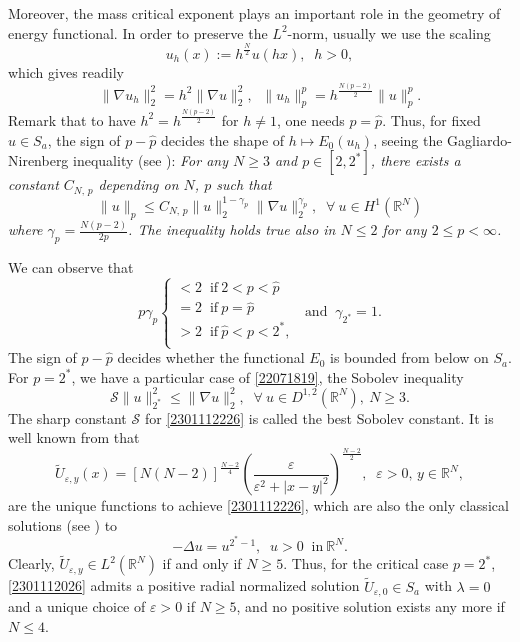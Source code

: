 \documentclass[10pt]{article}
\numberwithin{equation}{section}
\numberwithin{equation}{section}
\begin{document}
Moreover, the mass critical exponent plays an important role in the geometry of energy functional. In order to preserve the $L^2$-norm, usually we use the scaling
\begin{equation}\label{2301111617}
 u_h(x):=h^{\frac{N}{2}}u(h x),\;\; h>0,
\end{equation}
which gives readily
\[
\|\nabla u_h\|_2^2=h^2\|\nabla u\|_2^2, \;\;\| u_h\|_p^p=h^{\frac{N(p-2)}{2}}\|u\|_p^p.
\]
Remark that to have $h^2=h^{\frac{N(p-2)}{2}}$ for $h\neq 1$, one needs $p=\hat{p}$. Thus, for fixed $u\in S_a$, the sign of $p-\hat{p}$ decides the shape of $h\mapsto E_0(u_h)$, seeing the Gagliardo-Nirenberg inequality (see \cite{N1959}): {\it For any $N\ge 3$ and $p\in [2,2^*]$, there exists a constant $C_{N,\, p}$ depending on $N$, $p$ such that
\begin{equation}\label{22071819}
\|u\|_p\le C_{N,\, p}\|u\|_2^{1-\gamma_p}\|\nabla u\|_2^{\gamma_p},\;\; \forall~ u\in H^{1}(\mathbb{R}^N)
\end{equation}
where $\gamma_p=\frac{N(p-2)}{2p}$. The inequality holds true also in $N\le 2$ for any $2\le p<\infty$.}\par
We can observe that
\[
p\gamma_p
\begin{cases}
<2\;\; \text{if}~2<p<\hat{p}\\
=2\;\; \text{if}~p=\hat{p}\\
>2\;\; \text{if}~\hat{p}<p<2^*,\\
\end{cases}\;\; \text{and}\;\; \gamma_{2^*}=1.
\]
The sign of $p-\hat{p}$ decides whether the functional $E_0$ is bounded from below on $S_a$.
For $p=2^*$, we have a particular case of \eqref{22071819}, the Sobolev inequality
\begin{equation}\label{2301112226}
\mathcal{S}\|u\|_{2^*}^2\le \|\nabla u\|_2^2, \;\; \forall~ u\in D^{1, 2}(\mathbb{R}^N),~N\ge 3.
\end{equation}
The sharp constant $\mathcal{S}$ for \eqref{2301112226} is called the best Sobolev constant. It is well known from \cite{Talenti1976} that
\[
\widetilde{U}_{\varepsilon, y}(x)=[N(N-2)]^{\frac{N-2}{4}}\left( \frac{\varepsilon}{\varepsilon^2+|x-y|^2} \right)^{\frac{N-2}{2}},\;\; \varepsilon>0, \,y\in \mathbb{R}^N,
\]
are the unique functions to achieve \eqref{2301112226}, which are also the only classical solutions (see \cite{CGS1989}) to
\[
-\Delta u= u^{2^*-1},\;\; u>0\;\; \text{in}~\mathbb{R}^N.
\]
Clearly, $\widetilde{U}_{\varepsilon, y}\in L^2(\mathbb{R}^N)$ if and only if $N\ge 5$. Thus, for the critical case $p=2^*$, \eqref{2301112026} admits a positive radial normalized solution $\widetilde{U}_{\varepsilon, 0}\in S_a$ with $\lambda=0$ and a  unique choice of $\varepsilon>0$ if $N\ge5$, and no positive solution exists any more if $N\le 4$. \par
\end{document}
